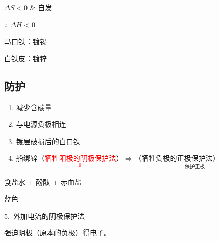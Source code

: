         \(\Delta S < 0\) \& 自发

        \(\therefore\) \(\Delta H < 0\)

        马口铁：镀锡

        白铁皮：镀锌

    \subsection{防护}\label{subsec:防护}

        \begin{enumerate}
            \item 减少含碳量
            \item 与电源负极相连
            \item 镀层破损后的白口铁
            \item 船绑锌（\textcolor{red}{\(\underset{\Downarrow}{\text{牺牲阳极的阴极保护法}}\)}）\(\Rightarrow\)（牺牲负极的\(\underset{\text{保护正极}}{\text{正极保护法}}\)）
        \end{enumerate}

        食盐水 + 酚酞 + 赤血盐

        \begin{center}
        
        \end{center}

         蓝色

        5.\ 外加电流的阴极保护法

        强迫阴极（原本的负极）得电子。

        \begin{center}
        
        \end{center}
